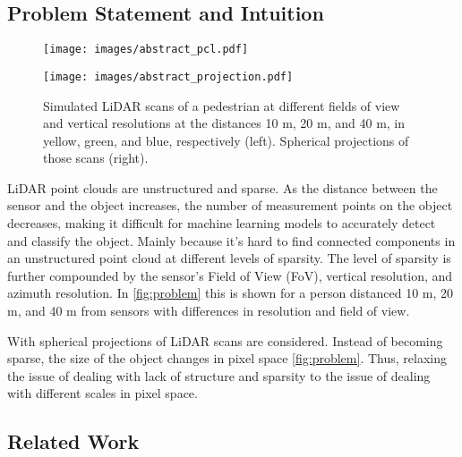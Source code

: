 \subsection{Problem Statement and Intuition} \label{sec:problem}
\begin{figure}
     \centering
     \begin{minipage}{0.49\columnwidth}
        \texttt{[image: images/abstract\_pcl.pdf]}
    \end{minipage}
    \hfill
    \begin{minipage}{0.49\columnwidth}
        \texttt{[image: images/abstract\_projection.pdf]}
    \end{minipage}
    \caption{Simulated LiDAR scans of a pedestrian at different fields of view and vertical resolutions at the distances 10 m, 20 m, and 40 m, in yellow, green, and blue, respectively (left). Spherical projections of those scans (right).}
    \label{fig:problem}
\end{figure}
LiDAR point clouds are unstructured and sparse. As the distance between the sensor and the object increases, the number of measurement points on the object decreases, making it difficult for machine learning models to accurately detect and classify the object. Mainly because it's hard to find connected components in an unstructured point cloud at different levels of sparsity. The level of sparsity is further compounded by the sensor's Field of View (FoV), vertical resolution, and azimuth resolution. In \autoref{fig:problem} this is shown for a person distanced 10 m, 20 m, and 40 m from sensors with differences in resolution and field of view. 

With spherical projections of LiDAR scans are considered. Instead of becoming sparse, the size of the object changes in pixel space \autoref{fig:problem}. Thus, relaxing the issue of dealing with lack of structure and sparsity to the issue of dealing with different scales in pixel space. 

\subsection{Related Work} \label{sec_sota}

